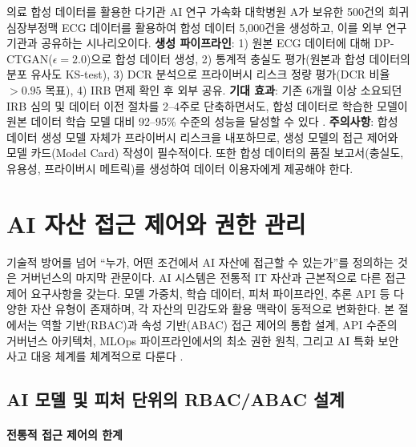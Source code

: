 \begin{practicaltool}{의료 합성 데이터를 활용한 다기관 AI 연구 가속화}
대학병원 A가 보유한 500건의 희귀 심장부정맥 ECG 데이터를 활용하여 합성 데이터 5,000건을 생성하고, 이를 외부 연구 기관과 공유하는 시나리오이다.
\textbf{생성 파이프라인}: 1) 원본 ECG 데이터에 대해 DP-CTGAN($\epsilon=2.0$)으로 합성 데이터 생성, 2) 통계적 충실도 평가(원본과 합성 데이터의 분포 유사도 KS-test), 3) DCR 분석으로 프라이버시 리스크 정량 평가(DCR 비율 $> 0.95$ 목표), 4) IRB 면제 확인 후 외부 공유.
\textbf{기대 효과}: 기존 6개월 이상 소요되던 IRB 심의 및 데이터 이전 절차를 2--4주로 단축하면서도, 합성 데이터로 학습한 모델이 원본 데이터 학습 모델 대비 92--95\% 수준의 성능을 달성할 수 있다 \cite{price2019privacy}.
\textbf{주의사항}: 합성 데이터 생성 모델 자체가 프라이버시 리스크을 내포하므로, 생성 모델의 접근 제어와 모델 카드(Model Card) 작성이 필수적이다. 또한 합성 데이터의 품질 보고서(충실도, 유용성, 프라이버시 메트릭)를 생성하여 데이터 이용자에게 제공해야 한다.
\end{practicaltool}


\section{AI 자산 접근 제어와 권한 관리}
\label{sec:15.3}

기술적 방어를 넘어 ``누가, 어떤 조건에서 AI 자산에 접근할 수 있는가''를 정의하는 것은 거버넌스의 마지막 관문이다. AI 시스템은 전통적 IT 자산과 근본적으로 다른 접근 제어 요구사항을 갖는다. 모델 가중치, 학습 데이터, 피처 파이프라인, 추론 API 등 다양한 자산 유형이 존재하며, 각 자산의 민감도와 활용 맥락이 동적으로 변화한다. 본 절에서는 역할 기반(RBAC)과 속성 기반(ABAC) 접근 제어의 통합 설계, API 수준의 거버넌스 아키텍처, MLOps 파이프라인에서의 최소 권한 원칙, 그리고 AI 특화 보안 사고 대응 체계를 체계적으로 다룬다 \cite{falco2021governing}.

\subsection{AI 모델 및 피처 단위의 RBAC/ABAC 설계}
\label{sec:15.3.1}

\paragraph{전통적 접근 제어의 한계}


